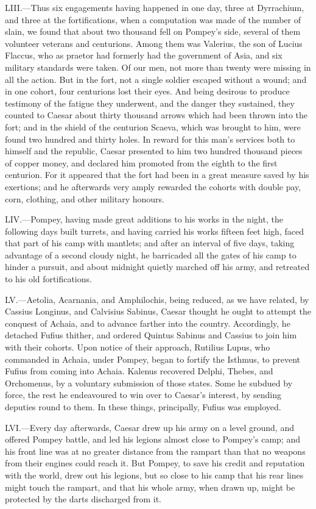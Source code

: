 LIII.—Thus six engagements having happened in one day, three at
Dyrrachium, and three at the fortifications, when a computation was made
of the number of slain, we found that about two thousand fell on
Pompey's side, several of them volunteer veterans and centurions. Among
them was Valerius, the son of Lucius Flaccus, who as praetor had
formerly had the government of Asia, and six military standards were
taken. Of our men, not more than twenty were missing in all the action.
But in the fort, not a single soldier escaped without a wound; and in
one cohort, four centurions lost their eyes. And being desirous to
produce testimony of the fatigue they underwent, and the danger they
sustained, they counted to Caesar about thirty thousand arrows which had
been thrown into the fort; and in the shield of the centurion Scaeva,
which was brought to him, were found two hundred and thirty holes. In
reward for this man's services both to himself and the republic, Caesar
presented to him two hundred thousand pieces of copper money, and
declared him promoted from the eighth to the first centurion. For it
appeared that the fort had been in a great measure saved by his
exertions; and he afterwards very amply rewarded the cohorts with double
pay, corn, clothing, and other military honours.

LIV.—Pompey, having made great additions to his works in the night, the
following days built turrets, and having carried his works fifteen feet
high, faced that part of his camp with mantlets; and after an interval
of five days, taking advantage of a second cloudy night, he barricaded
all the gates of his camp to hinder a pursuit, and about midnight
quietly marched off his army, and retreated to his old fortifications.

LV.—Aetolia, Acarnania, and Amphilochis, being reduced, as we have
related, by Cassius Longinus, and Calvisius Sabinus, Caesar thought he
ought to attempt the conquest of Achaia, and to advance farther into the
country. Accordingly, he detached Fufius thither, and ordered Quintus
Sabinus and Cassius to join him with their cohorts. Upon notice of their
approach, Rutilius Lupus, who commanded in Achaia, under Pompey, began
to fortify the Isthmus, to prevent Fufius from coming into Achaia.
Kalenus recovered Delphi, Thebes, and Orchomenus, by a voluntary
submission of those states. Some he subdued by force, the rest he
endeavoured to win over to Caesar's interest, by sending deputies round
to them. In these things, principally, Fufius was employed.

LVI.—Every day afterwards, Caesar drew up his army on a level ground,
and offered Pompey battle, and led his legions almost close to Pompey's
camp; and his front line was at no greater distance from the rampart
than that no weapons from their engines could reach it. But Pompey, to
save his credit and reputation with the world, drew out his legions, but
so close to his camp that his rear lines might touch the rampart, and
that his whole army, when drawn up, might be protected by the darts
discharged from it.

